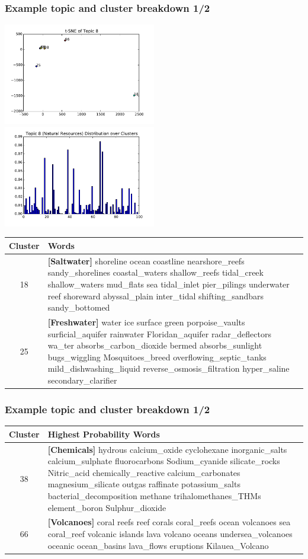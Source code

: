 \documentclass{beamer}
\begin{document}
\begin{frame}
  \frametitle{Example topic and cluster breakdown 1/2}
  \includegraphics[width=0.5\textwidth]{assets/gtm100_topic8_tsne.pdf}
  \includegraphics[width=0.5\textwidth]{assets/gtm100_topic8_probs.pdf}

  \begin{tabularx}{\textwidth}{|c|X|}
\hline 
{\tiny{}Cluster} & {\tiny{}Words}\tabularnewline
\hline 
{\tiny{}18} & {\tiny{}\textbf{[Saltwater]} shoreline ocean coastline nearshore\_reefs sandy\_shorelines
coastal\_waters shallow\_reefs tidal\_creek shallow\_waters mud\_flats
sea tidal\_inlet pier\_pilings underwater reef shoreward abyssal\_plain
inter\_tidal shifting\_sandbars sandy\_bottomed }\tabularnewline
\hline 
{\tiny{}25} & {\tiny{}\textbf{[Freshwater]} water ice surface green porpoise\_vaults surficial\_aquifer
rainwater Floridan\_aquifer radar\_deflectors wa\_ter absorbs\_carbon\_dioxide
bermed absorbs\_sunlight bugs\_wiggling Mosquitoes\_breed overflowing\_septic\_tanks
mild\_dishwashing\_liquid reverse\_osmosis\_filtration hyper\_saline
secondary\_clarifier }\tabularnewline
\hline 
  \end{tabularx}

\end{frame}

\begin{frame}
  \frametitle{Example topic and cluster breakdown 1/2}

\begin{tabularx}{\textwidth}{|c|X|}
\hline 
{\tiny{}Cluster} & {\tiny{}Highest Probability Words}\tabularnewline
\hline 
{\tiny{}38} & {\tiny{}\textbf{[Chemicals]} hydrous calcium\_oxide cyclohexane inorganic\_salts calcium\_sulphate
fluorocarbons Sodium\_cyanide silicate\_rocks Nitric\_acid chemically\_reactive
calcium\_carbonates magnesium\_silicate outgas raffinate potassium\_salts
bacterial\_decomposition methane trihalomethanes\_THMs element\_boron
Sulphur\_dioxide }\tabularnewline
\hline 
{\tiny{}66} & {\tiny{}\textbf{[Volcanoes]} coral reefs reef corals coral\_reefs ocean volcanoes sea coral\_reef
volcanic islands lava volcano oceans undersea\_volcanoes oceanic ocean\_basins
lava\_flows eruptions Kilauea\_Volcano}\tabularnewline
\hline 
\end{tabularx}
  
\end{frame}
\end{document}
